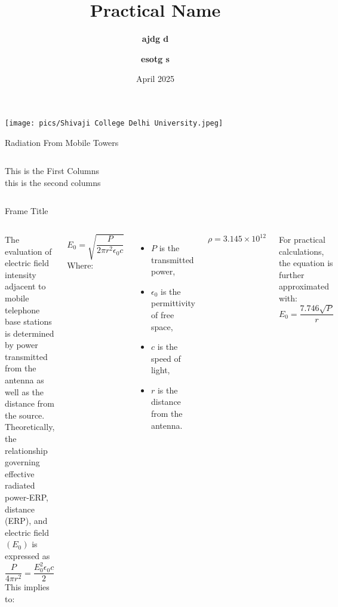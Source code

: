 \documentclass[7pt, aspectratio=169]{beamer}
\title{Practical Name}
\author{\textbf{ajdg d} \inst{1} \and \textbf{esotg s} \inst{2}}
\date{April 2025}
\institute{
\inst{1} Department of physics
}
\begin{document}
    \begin{frame}
    \titlepage
    \begin{center}
        \texttt{[image: pics/Shivaji College Delhi University.jpeg]}
    \end{center}
    \end{frame}

\begin{frame}{Radiation From Mobile Towers}
    \begin{columns}
         This is the First Columns\\
        \vspace{0.1cm}
         this is the second columns\\
    \end{columns}
\end{frame}


\begin{frame}{Frame Title}
    \begin{columns}
     The evaluation of electric field intensity adjacent to mobile telephone base stations is determined by power transmitted from the antenna as well as the distance from the source. Theoretically, the relationship governing effective radiated power-ERP, distance (ERP), and electric field \((E_0)\) is expressed as \cite{roe2012probability}
    \[
        \frac{P}{4 \pi r^2} = \frac{E_0^2 \epsilon_0 c}{2}
    \]
        This implies to:

    \[
        E_0 = \sqrt{\frac{P}{2 \pi r^2 \epsilon_0 c}}
    \]
    Where:
    \begin{itemize}
        \item \(P\) is the transmitted power, \cite{roe2012probability}
        \item \( \epsilon_0 \) is the permittivity of free space,
        \item \(c\) is the speed of light,
        \item \(r\) is the distance from the antenna.
    \end{itemize}

    \[\rho = 3.145 \times 10^{12}\]

    For practical calculations, the equation is further approximated with:
    \[
        E_0 = \frac{7.746 \sqrt{P}}{r}
    \]
    \end{columns}

\end{frame}
\end{document}
